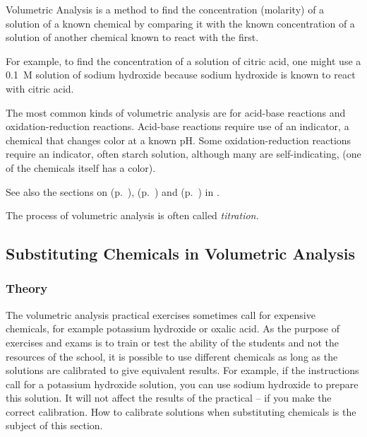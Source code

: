 Volumetric Analysis is a method to find the concentration (molarity) of a solution of a known chemical by comparing it with the known concentration of a solution of another chemical known to react with the first.

For example, to find the concentration of a solution of citric acid, one might use a 0.1~M solution of sodium hydroxide because sodium hydroxide is known to react with citric acid.

The most common kinds of volumetric analysis are for acid-base reactions and oxidation-reduction reactions. Acid-base reactions require use of an indicator, a chemical that changes color at a known pH. Some oxidation-reduction reactions require an indicator, often starch solution, although many are self-indicating, (one of the chemicals itself has a color). 

See also the sections on  (p.~\pageref{cha:prep-solutions}),  (p.~\pageref{cha:prep-solns-wo-bal}) and  (p.~\pageref{cha:rel-stan}) in .

The process of volumetric analysis is often called \textit{titration.}

\subsection{Substituting Chemicals in Volumetric Analysis}
\label{cha:subchemvolana}
\subsubsection{Theory}

The volumetric analysis practical exercises sometimes call for expensive chemicals, for example potassium hydroxide or oxalic acid. As the purpose of exercises and exams is to train or test the ability of the students and not the resources of the school, it is possible to use different chemicals as long as the solutions are calibrated to give equivalent results. For example, if the instructions call for a potassium hydroxide solution, you can use sodium hydroxide to prepare this solution. It will not affect the results of the practical -- if you make the correct calibration. How to calibrate solutions when substituting chemicals is the subject of this section.


